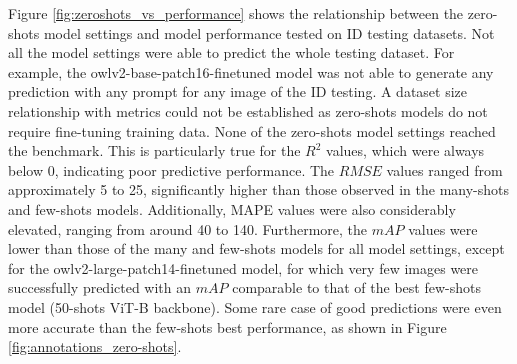 \documentclass[12pt,a4paper,oneside]{report}
\begin{document}
Figure \ref{fig:zeroshots_vs_performance} shows the relationship between the zero-shots 
model settings and model performance tested on ID testing datasets. Not all the 
model settings were able to predict the whole testing dataset. For example, the 
owlv2-base-patch16-finetuned model was not able to generate any prediction with 
any prompt for any image of the ID testing. A dataset size relationship with metrics 
could not be established as zero-shots models do not require fine-tuning training 
data.
None of the zero-shots model settings reached the benchmark. This is particularly true for the 
$R^2$ values, which were always below 0, indicating poor predictive performance. The 
$RMSE$ values ranged from approximately 5 to 25, significantly higher than those 
observed in the many-shots and few-shots models. Additionally, MAPE values were 
also considerably elevated, ranging from around 40 to 140. Furthermore, the 
$mAP$ values were lower than those of the many and few-shots models for all model 
settings, except for the owlv2-large-patch14-finetuned model, for which very few 
images were successfully predicted with an 
$mAP$ comparable to that of the best few-shots model (50-shots ViT-B backbone).
Some rare case of good predictions were even more accurate than the few-shots best performance, 
as shown in Figure \ref{fig:annotations_zero-shots}.

\end{document}
